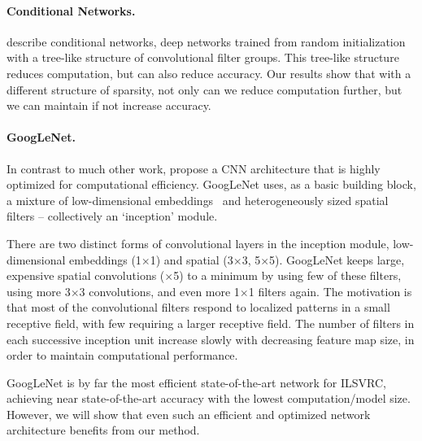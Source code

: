 \documentclass[thesis]{subfiles}
\begin{document}
	
	\paragraph{Conditional Networks.} \citet{1603.01250v1} describe conditional networks, \ie deep networks trained from random initialization with a tree-like structure of convolutional filter groups. This tree-like structure reduces computation, but can also reduce accuracy. Our results show that with a different structure of sparsity, not only can we reduce computation further, but we can maintain if not increase accuracy.
	
	\paragraph{GoogLeNet.} In contrast to much other work, \citet{Szegedy2014going} propose a CNN architecture that is highly optimized for computational efficiency. GoogLeNet uses, as a basic building block, a mixture of low-dimensional embeddings~\citep{lin2013network} and heterogeneously sized spatial filters -- collectively an `inception' module. 
	
	There are two distinct forms of convolutional layers in the inception module, low-dimensional embeddings (1$\times$1) and spatial (3$\times$3, 5$\times $5). GoogLeNet keeps large, expensive spatial convolutions ($\times$5) to a minimum by using few of these filters, using more 3$\times$3 convolutions, and even more 1$\times$1 filters again. The motivation is that most of the convolutional filters respond to localized patterns in a small receptive field, with few requiring a larger receptive field. The number of filters in each successive inception unit increase slowly with decreasing feature map size, in order to maintain computational performance.
	
	GoogLeNet is by far the most efficient state-of-the-art network for ILSVRC, achieving near state-of-the-art accuracy with the lowest computation/model size. However, we will show that even such an efficient and optimized network architecture benefits from our method.
	
\end{document}
